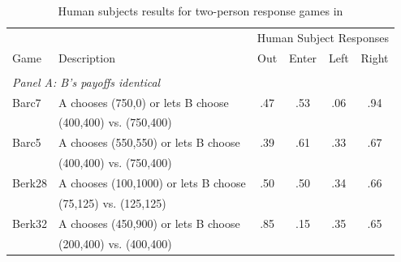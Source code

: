 \begin{table}[h!]
\caption{Human subjects results for two-person response games in \cite{charness2002understanding}}
\label{tab:cr_games_results}
\begin{center}
\footnotesize
\begin{tabular}{llcccc}
\hline
& & \multicolumn{4}{c}{Human Subject Responses} \\
Game & Description & Out & Enter & Left & Right \\
\hline
\\[-1.8ex]
\multicolumn{6}{l}{\textit{Panel A: B's payoffs identical}} \\[0.5ex]
Barc7 & A chooses (750,0) or lets B choose & .47 & .53 & .06 & .94 \\
& (400,400) vs. (750,400) & & & & \\
Barc5 & A chooses (550,550) or lets B choose & .39 & .61 & .33 & .67 \\
& (400,400) vs. (750,400) & & & & \\
Berk28 & A chooses (100,1000) or lets B choose & .50 & .50 & .34 & .66 \\
& (75,125) vs. (125,125) & & & & \\
Berk32 & A chooses (450,900) or lets B choose & .85 & .15 & .35 & .65 \\
& (200,400) vs. (400,400) & & & & \\[1ex]


\end{tabular}
\end{center}
\end{table}
